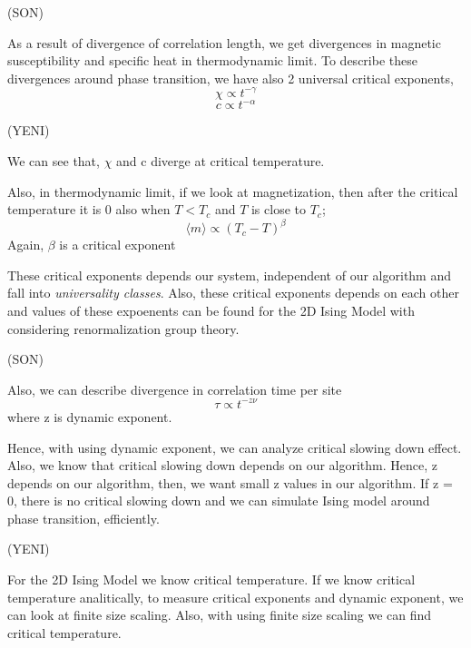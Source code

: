 \documentclass[12pt,fleqn]{report}
\begin{document}
(SON)






As a result of divergence of correlation length, we get divergences in 
magnetic susceptibility and specific heat in thermodynamic limit. To 
describe these divergences around phase transition, we have also 2 
universal critical exponents, 
\begin{equation}
\chi \propto t^{-\gamma}
\end{equation}
\begin{equation}
c \propto t^{-\alpha}
\end{equation}






(YENI)

We can see that, $\chi$ and c diverge at critical temperature.

Also, in thermodynamic limit, if we look at magnetization, then after the 
critical temperature it is 0 also when $T < T_c$ and $T$ is close to $T_c$;
\begin{equation}
\langle m \rangle \propto (T_c - T )^\beta
\end{equation}
Again, $\beta$ is a critical exponent


These critical exponents depends our system, independent of our 
algorithm and fall into \textit{universality classes}. Also, these critical 
exponents depends on each other and values of these expoenents can be 
found for the 2D Ising Model with considering renormalization group 
theory.

(SON)






Also, we can describe divergence in correlation time per site
\begin{equation}
\tau \propto t^{-z \nu}
\end{equation}
where z is dynamic exponent.

Hence, with using dynamic exponent, we can analyze critical slowing down 
effect. Also, we know that critical slowing down depends on our algorithm. 
Hence, z depends on our algorithm, then, we want small z values in our 
algorithm. If z = 0, there is no critical slowing down and we can simulate 
Ising model around phase transition, efficiently. 






(YENI)

For the 2D Ising Model we know critical temperature. If we know critical 
temperature analitically, to measure critical exponents and dynamic 
exponent, 
we can look at finite size scaling. Also, with using finite size scaling we can 
find critical temperature. 
\end{document}
